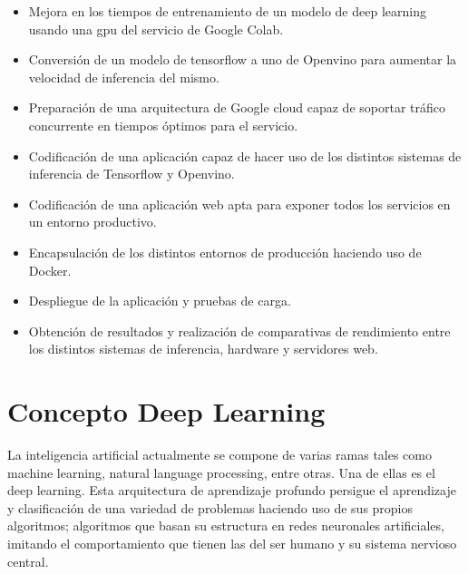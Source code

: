 \begin{itemize}
    \item Mejora en los tiempos de entrenamiento de un modelo de deep learning usando una gpu del servicio de Google Colab.
    \item Conversión de un modelo de tensorflow a uno de Openvino para aumentar la velocidad de inferencia del mismo.
    \item Preparación de una arquitectura de Google cloud capaz de soportar tráfico concurrente en tiempos óptimos para el servicio.
    \item Codificación de una aplicación capaz de hacer uso de los distintos sistemas de inferencia de Tensorflow y Openvino.
    \item Codificación de una aplicación web apta para exponer todos los servicios en un entorno productivo.
    \item Encapsulación de los distintos entornos de producción haciendo uso de Docker.
    \item Despliegue de la aplicación y pruebas de carga.
    \item Obtención de resultados y realización de comparativas de rendimiento entre los distintos sistemas de inferencia, hardware y servidores web.
\end{itemize}


\section{Concepto Deep Learning}\label{sec:concepto-deep-learning}
La inteligencia artificial actualmente se compone de varias ramas tales como machine learning, natural language processing, entre otras.
Una de ellas es el deep learning. Esta arquitectura de aprendizaje profundo persigue el aprendizaje y clasificación de una variedad de problemas
haciendo uso de sus propios algoritmos;
algoritmos que basan su estructura en redes neuronales artificiales, imitando el comportamiento que tienen las del ser humano y su sistema nervioso central.

